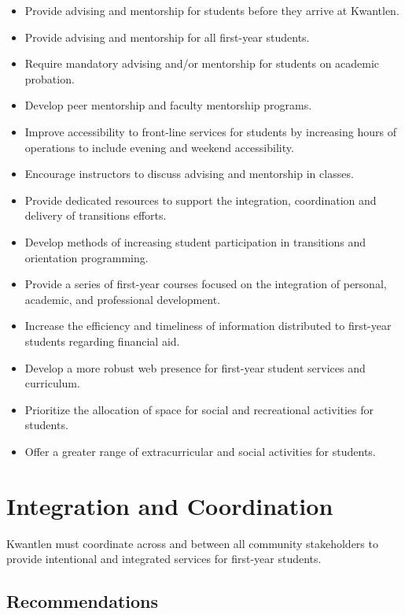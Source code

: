 \documentclass[11pt, letterpaper]{article}
\begin{document}
\begin{itemize}
\item
  Provide advising and mentorship for students before they arrive at
  Kwantlen.
\item
  Provide advising and mentorship for all first-year students.
\item
  Require mandatory advising and/or mentorship for students on academic
  probation.
\item
  Develop peer mentorship and faculty mentorship programs.
\item
  Improve accessibility to front-line services for students by
  increasing hours of operations to include evening and weekend
  accessibility.
\item
  Encourage instructors to discuss advising and mentorship in classes.
\item
  Provide dedicated resources to support the integration, coordination
  and delivery of transitions efforts.
\item
  Develop methods of increasing student participation in transitions and
  orientation programming.
\item
  Provide a series of first-year courses focused on the integration of
  personal, academic, and professional development.
\item
  Increase the efficiency and timeliness of information distributed to
  first-year students regarding financial aid.
\item
  Develop a more robust web presence for first-year student services and
  curriculum.
\item
  Prioritize the allocation of space for social and recreational
  activities for students.
\item
  Offer a greater range of extracurricular and social activities for
  students.
\end{itemize}

\section{Integration and Coordination}

Kwantlen must coordinate across and between all community stakeholders to provide intentional and integrated services for first-year students.

\subsection{Recommendations}
\end{document}

